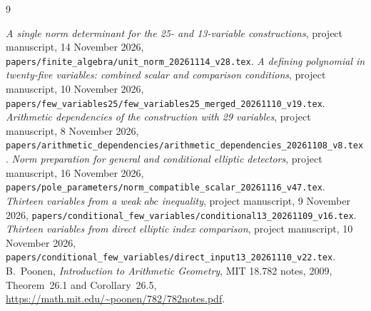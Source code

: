 \documentclass[11pt,a4paper]{article}
\begin{document}
\begin{thebibliography}{9}\raggedright
{}\emph{A single norm determinant for the 25- and
13-variable constructions}, project manuscript, 14 November 2026,
\nolinkurl{papers/finite_algebra/unit_norm_20261114_v28.tex}.
\emph{A defining polynomial in twenty-five variables:
combined scalar and comparison conditions}, project manuscript,
10 November 2026,
\nolinkurl{papers/few_variables25/few_variables25_merged_20261110_v19.tex}.
\emph{Arithmetic dependencies of the construction
with 29 variables}, project manuscript, 8 November 2026,
\nolinkurl{papers/arithmetic_dependencies/arithmetic_dependencies_20261108_v8.tex}.
\emph{Norm preparation for general and
conditional elliptic detectors}, project manuscript, 16 November 2026,
\nolinkurl{papers/pole_parameters/norm_compatible_scalar_20261116_v47.tex}.
\emph{Thirteen variables from a weak $abc$
inequality}, project manuscript, 9 November 2026,
\nolinkurl{papers/conditional_few_variables/conditional13_20261109_v16.tex}.
\emph{Thirteen variables from direct elliptic index
comparison}, project manuscript, 10 November 2026,
\nolinkurl{papers/conditional_few_variables/direct_input13_20261110_v22.tex}.
 B.~Poonen, \emph{Introduction to Arithmetic Geometry},
MIT 18.782 notes, 2009, Theorem~26.1 and Corollary~26.5,
\url{https://math.mit.edu/~poonen/782/782notes.pdf}.
\end{thebibliography}
\end{document}
